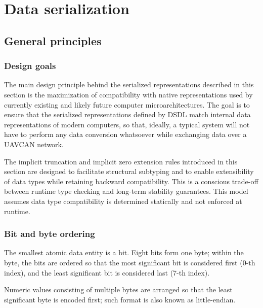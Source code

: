 \section{Data serialization}\label{sec:dsdl_data_serialization}

\newcommand{\hugett}[1]{\texttt{\huge{#1}}}

\subsection{General principles}

\subsubsection{Design goals}

The main design principle behind the serialized representations described in this section is
the maximization of compatibility with native representations used by currently existing and
likely future computer microarchitectures.
The goal is to ensure that the serialized representations defined by DSDL match internal data representations of
modern computers, so that, ideally, a typical system will not have to perform any data conversion whatsoever while
exchanging data over a UAVCAN network.

The implicit truncation and implicit zero extension rules introduced in this section are designed to
facilitate structural subtyping and to enable extensibility of data types while retaining backward compatibility.
This is a conscious trade-off between runtime type checking and long-term stability guarantees.
This model assumes data type compatibility is determined statically and not enforced at runtime.

\subsubsection{Bit and byte ordering}

The smallest atomic data entity is a bit.
Eight bits form one byte;
within the byte, the bits are ordered so that the most significant bit is considered first (0-th index),
and the least significant bit is considered last (7-th index).

Numeric values consisting of multiple bytes are arranged so that the least significant byte is encoded first;
such format is also known as little-endian.

